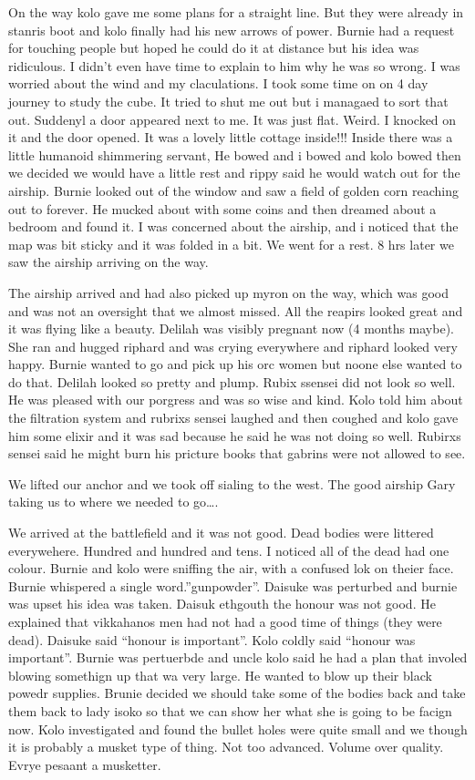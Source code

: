 \begin{multicols}{2}
On the way kolo gave me some plans for a straight line. But they were already in stanris boot and kolo finally had his new arrows of power. Burnie had a request for touching people but hoped he could do it at distance but his idea was ridiculous. I didn’t even have time to explain to him why he was so wrong. I was worried about the wind and my claculations. I took some time on on 4 day journey to study the cube. It tried to shut me out but i managaed to sort that out. Suddenyl a door appeared next to me. It was just flat. Weird. I knocked on it and the door opened. It was a lovely little cottage inside!!! Inside there was a little humanoid shimmering servant, He bowed and i bowed and kolo bowed then we decided we would have a little rest and rippy said he would watch out for the airship. Burnie looked out of the window and saw a field of golden corn reaching out to forever. He mucked about with some coins and then dreamed about a bedroom and found it. I was concerned about the airship, and i noticed that the map was bit sticky and it was folded in a bit. We went for a rest. 8 hrs later we saw the airship arriving on the way.\medskip

The airship arrived and had also picked up myron on the way, which was good and was not an oversight that we almost missed. All the reapirs looked great and it was flying like a beauty. Delilah was visibly pregnant now (4 months maybe). She ran and hugged riphard and was crying everywhere and riphard looked very happy. Burnie wanted to go and pick up his orc women but noone else wanted to do that. Delilah looked so pretty and plump. Rubix ssensei did not look so well. He was pleased with our porgress and was so wise and kind. Kolo told him about the filtration system and rubrixs sensei laughed and then coughed and kolo gave him some elixir and it was sad because he said he was not doing so well. Rubirxs sensei said he might burn his pricture books that gabrins were not allowed to see.\medskip

We lifted our anchor and we took off sialing to the west. The good airship Gary taking us to where we needed to go….\medskip

We arrived at the battlefield and it was not good. Dead bodies were littered everywehere. Hundred and hundred and tens. I noticed all of the dead had one colour. Burnie and kolo were sniffing the air, with a confused lok on theier face. Burnie whispered a single word.”gunpowder”. Daisuke was perturbed and burnie was upset his idea was taken. Daisuk ethgouth the honour was not good. He explained that vikkahanos men had not had a good time of things (they were dead). Daisuke said “honour is important”. Kolo coldly said “honour was important”. Burnie was pertuerbde and uncle kolo said he had a plan that involed blowing somethign up that wa very large. He wanted to blow up their black powedr supplies. Brunie decided we should take some of the bodies back and take them back to lady isoko so that we can show her what she is going to be facign now. Kolo investigated and found the bullet holes were quite small and we though it is probably a musket type of thing. Not too advanced. Volume over quality. Evrye pesaant a musketter.\medskip


\end{multicols}
